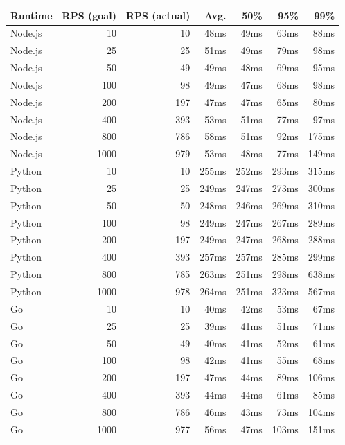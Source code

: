 \begin{table}[b]
    \centering
    \begin{tabular}{|l|r|r|r|r|r|r|} \hline
    \textbf{Runtime} & \textbf{RPS (goal)} & \textbf{RPS (actual)} & \textbf{Avg.} & \textbf{50\%} & \textbf{95\%} & \textbf{99\%} \\ \hline
    Node.js	&	10	&	10	&	48ms	&	49ms	&	63ms	&	88ms	\\ \hline
Node.js	&	25	&	25	&	51ms	&	49ms	&	79ms	&	98ms	\\ \hline
Node.js	&	50	&	49	&	49ms	&	48ms	&	69ms	&	95ms	\\ \hline
Node.js	&	100	&	98	&	49ms	&	47ms	&	68ms	&	98ms	\\ \hline
Node.js	&	200	&	197	&	47ms	&	47ms	&	65ms	&	80ms	\\ \hline
Node.js	&	400	&	393	&	53ms	&	51ms	&	77ms	&	97ms	\\ \hline
Node.js	&	800	&	786	&	58ms	&	51ms	&	92ms	&	175ms	\\ \hline
Node.js	&	1000	&	979	&	53ms	&	48ms	&	77ms	&	149ms	\\ \hline
Python	&	10	&	10	&	255ms	&	252ms	&	293ms	&	315ms	\\ \hline
Python	&	25	&	25	&	249ms	&	247ms	&	273ms	&	300ms	\\ \hline
Python	&	50	&	50	&	248ms	&	246ms	&	269ms	&	310ms	\\ \hline
Python	&	100	&	98	&	249ms	&	247ms	&	267ms	&	289ms	\\ \hline
Python	&	200	&	197	&	249ms	&	247ms	&	268ms	&	288ms	\\ \hline
Python	&	400	&	393	&	257ms	&	257ms	&	285ms	&	299ms	\\ \hline
Python	&	800	&	785	&	263ms	&	251ms	&	298ms	&	638ms	\\ \hline
Python	&	1000	&	978	&	264ms	&	251ms	&	323ms	&	567ms	\\ \hline
Go	&	10	&	10	&	40ms	&	42ms	&	53ms	&	67ms	\\ \hline
Go	&	25	&	25	&	39ms	&	41ms	&	51ms	&	71ms	\\ \hline
Go	&	50	&	49	&	40ms	&	41ms	&	52ms	&	61ms	\\ \hline
Go	&	100	&	98	&	42ms	&	41ms	&	55ms	&	68ms	\\ \hline
Go	&	200	&	197	&	47ms	&	44ms	&	89ms	&	106ms	\\ \hline
Go	&	400	&	393	&	44ms	&	44ms	&	61ms	&	85ms	\\ \hline
Go	&	800	&	786	&	46ms	&	43ms	&	73ms	&	104ms	\\ \hline
Go	&	1000	&	977	&	56ms	&	47ms	&	103ms	&	151ms	\\ \hline

\end{tabular}
\end{table}
